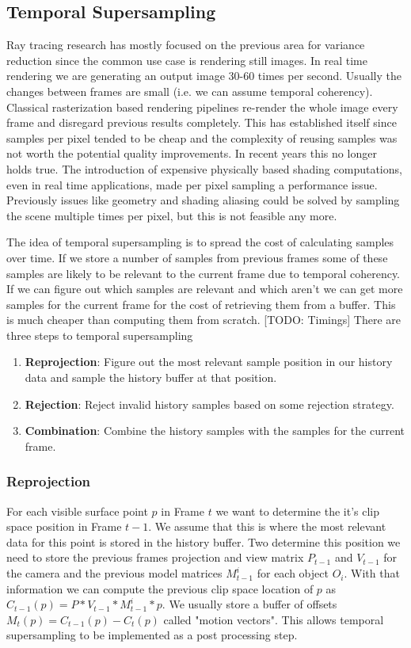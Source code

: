 \documentclass{ACGSeminar}
\begin{document}
\subsection{Temporal Supersampling}
Ray tracing research has mostly focused on the previous area for variance reduction since the common use case is rendering still images.
In real time rendering we are generating an output image 30-60 times per second. Usually the changes between frames are small (i.e. we can assume temporal coherency). Classical rasterization based rendering pipelines re-render the whole image every frame and disregard previous results completely. This has established itself since samples per pixel tended to be cheap and the complexity of reusing samples was not worth the potential quality improvements.
In recent years this no longer holds true. The introduction of expensive physically based shading computations, even in real time applications, made per pixel sampling a performance issue. Previously issues like geometry and shading aliasing could be solved by sampling the scene multiple times per pixel, but this is not feasible any more.

The idea of temporal supersampling is to spread the cost of calculating samples over time. If we store a number of samples from previous frames some of these samples are likely to be relevant to the current frame due to temporal coherency. If we can figure out which samples are relevant and which aren't we can get more samples for the current frame for the cost of retrieving them from a buffer. This is much cheaper than computing them from scratch. [TODO: Timings]
There are three steps to temporal supersampling
\begin{enumerate}
\item \textbf{Reprojection}: Figure out the most relevant sample position in our history data and sample the history buffer at that position.
\item \textbf{Rejection}: Reject invalid history samples based on some rejection strategy.
\item \textbf{Combination}: Combine the history samples with the samples for the current frame.
\end{enumerate}

\subsubsection{Reprojection}
For each visible surface point $p$ in Frame $t$ we want to determine the it's clip space position in Frame $t-1$. We assume that this is where the most relevant data for this point is stored in the history buffer. Two determine this position we need to store the previous frames projection and view matrix $P_{t-1}$ and $V_{t-1}$ for the camera and the previous model matrices $M^{i}_{t-1}$ for each object $O_i$. 
With that information we can compute the previous clip space location of $p$ as $C_{t-1}(p) = P * V_{t-1} * M^{i}_{t-1} * p$. We usually store a buffer of offsets $M_t(p) = C_{t-1}(p) - C_{t}(p)$ called "motion vectors".
This allows temporal supersampling to be implemented as a post processing step.
\end{document}
